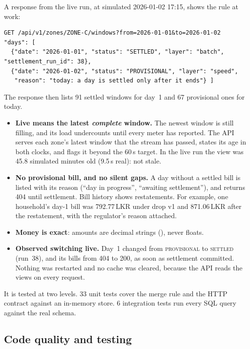 \documentclass[11pt,a4paper]{article}
\newcommand{\code}[1]{\texttt{\detokenize{#1}}}
\begin{document}
A response from the live run, at simulated 2026-01-02 17:15, shows the rule at work:

\begin{footnotesize}
\begin{verbatim}
GET /api/v1/zones/ZONE-C/windows?from=2026-01-01&to=2026-01-02
"days": [
  {"date": "2026-01-01", "status": "SETTLED", "layer": "batch", "settlement_run_id": 38},
  {"date": "2026-01-02", "status": "PROVISIONAL", "layer": "speed",
   "reason": "today: a day is settled only after it ends"} ]
\end{verbatim}
\end{footnotesize}
The response then lists 91 settled windows for day~1 and 67 provisional ones for today.

\begin{itemize}
  \item \textbf{Live means the latest \emph{complete} window.} The newest window is
  still filling, and its load undercounts until every meter has reported. The API
  serves each zone's latest window that the stream has passed, states its age in both
  clocks, and flags it \code{stale} beyond the 60\,s target. In the live run the view was
  45.8 simulated minutes old (9.5\,s real): not stale.
  \item \textbf{No provisional bill, and no silent gaps.} A day without a settled bill is
  listed with its reason (``day in progress'', ``awaiting settlement''), and
  \code{/bills} returns 404 until settlement. Bill history shows restatements. For
  example, one household's day-1 bill was 792.77\,LKR under drop v1 and 871.06\,LKR
  after the restatement, with the regulator's reason attached.
  \item \textbf{Money is exact}: amounts are decimal strings (\code{"871.06"}), never floats.
  \item \textbf{Observed switching live.} Day~1 changed from \textsc{provisional} to
  \textsc{settled} (run~38), and its bills from 404 to 200, as soon as settlement
  committed. Nothing was restarted and no cache was cleared, because the API reads the
  \code{batch.current_*} views on every request.
\end{itemize}

It is tested at two levels. 33 unit tests cover the merge rule and the HTTP contract
against an in-memory store. 6 integration tests run every SQL query against the real
schema.

\subsection{Code quality and testing}
\label{sec:quality}
\end{document}
